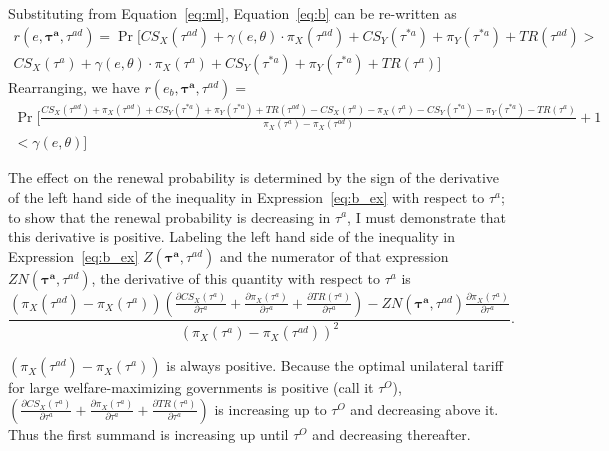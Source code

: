 \documentclass[10pt]{article}
\newcommand{\ve}{\theta}
\newcommand{\bta}{\bm{\tau^a}}
\newcommand{\tad}{\tau^{ad}}
\newcommand{\ga}{\gamma}
\begin{document}
Substituting from Equation~\ref{eq:ml}, Equation~\ref{eq:b} can be re-written as
\begin{multline}  
  r(e,\bta,\tad) = \Pr [ \mathit{CS}_X(\tad) + \ga(e,\ve) \cdot \pi_X(\tad) + \mathit{CS}_Y(\tau^{*a}) + \pi_Y(\tau^{*a}) + \mathit{TR}(\tad) >  \\ \mathit{CS}_X(\tau^a) + \ga(e,\ve) \cdot \pi_X(\tau^a) + \mathit{CS}_Y(\tau^{*a}) + \pi_Y(\tau^{*a}) + \mathit{TR}(\tau^a) ]
\end{multline}
Rearranging, we have $r(e_b,\bta,\tad) = $
\begin{multline}  
  \textstyle \Pr \Big[ \frac{\mathit{CS}_X(\tad) + \pi_X(\tad) + \mathit{CS}_Y(\tau^{*a}) + \pi_Y(\tau^{*a}) + \mathit{TR}(\tad)  -\mathit{CS}_X(\tau^a) - \pi_X(\tau^a) - \mathit{CS}_Y(\tau^{*a}) - \pi_Y(\tau^{*a}) - \mathit{TR}(\tau^a)}{\pi_X(\tau^a) - \pi_X(\tad)} + 1 \\ \textstyle < \ga(e,\ve) \Big]
  \label{eq:b_ex}
\end{multline}

The effect on the renewal probability is determined by the sign of the derivative of the left hand side of the inequality in Expression~\ref{eq:b_ex} with respect to $\tau^a$; to show that the renewal probability is decreasing in $\tau^a$, I must demonstrate that this derivative is positive. Labeling the left hand side of the inequality in Expression~\ref{eq:b_ex} $Z(\bta,\tad)$ and the numerator of that expression $ZN(\bta,\tad)$, the derivative of this quantity with respect to $\tau^{a}$ is 
\begin{equation}
  \frac{\left(\pi_X(\tad) - \pi_X(\tau^a)\right)\left(\frac{\partial \mathit{CS}_X(\tau^{a})}{\partial \tau^{a}} + \frac{\partial \pi_X(\tau^a)}{\partial \tau^{a}} + \frac{\partial \mathit{TR}(\tau^{a})}{\partial \tau^{a}}\right) - ZN(\bta,\tad) \frac{\partial \pi_X(\tau^a)}{\partial \tau^a}}{\left(\pi_X(\tau^a) - \pi_X(\tad)\right)^2}.
  \label{appex:a}
\end{equation}

\noindent $\left(\pi_X(\tad) - \pi_X(\tau^a)\right)$ is always positive. Because the optimal unilateral tariff for large welfare-maximizing governments is positive (call it $\tau^O$), $\left(\frac{\partial \mathit{CS}_X(\tau^{a})}{\partial \tau^{a}} + \frac{\partial \pi_X(\tau^a)}{\partial \tau^{a}} + \frac{\partial \mathit{TR}(\tau^{a})}{\partial \tau^{a}}\right)$ is increasing up to $\tau^O$ and decreasing above it. Thus the first summand is increasing up until $\tau^O$ and decreasing thereafter.
\end{document}

